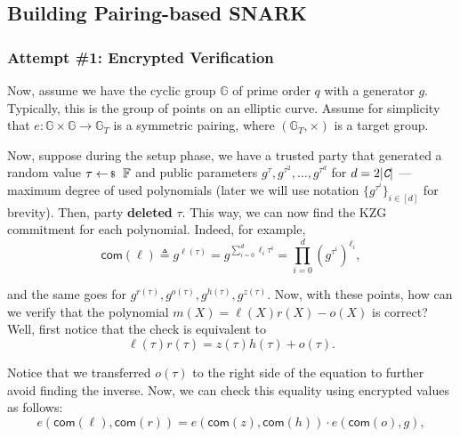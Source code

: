 \documentclass[../lecture-notes-148x210.tex]{subfiles}
\begin{document}
\subsection{Building Pairing-based SNARK}

\subsubsection{Attempt \#1: Encrypted Verification}

Now, assume we have the cyclic group $\mathbb{G}$ of prime order $q$ with a
generator $g$. Typically, this is the group of points on an elliptic curve.
Assume for simplicity that $e: \mathbb{G} \times \mathbb{G} \to \mathbb{G}_T$ is
a symmetric pairing, where $(\mathbb{G}_T, \times)$ is a target group.

Now, suppose during the setup phase, we have a trusted party that generated a random value $\tau \leftarrowS \mathbb{F}$ and public parameters $g^{\tau},g^{\tau^2},\dots,g^{\tau^{d}}$ for $d=2|\textit{\texttt{C}}|$ --- maximum degree of used polynomials (later we will use notation $\{g^{\tau^i}\}_{i \in [d]}$ for brevity). Then, party \textbf{deleted} $\tau$. This way, we can now find the KZG commitment for each polynomial. Indeed, for example,
\begin{equation*}
    \mathsf{com}(\ell) \triangleq g^{\ell(\tau)} = g^{\sum_{i=0}^d \ell_i \tau^i} = \prod_{i=0}^d (g^{\tau^i})^{\ell_i},
\end{equation*}

and the same goes for $g^{r(\tau)}, g^{o(\tau)}, g^{h(\tau)}, g^{z(\tau)}$. Now, with these points, how can we verify that the polynomial $m(X) = \ell(X)r(X) - o(X)$ is correct? Well, first notice that the check is equivalent to
\begin{equation*}
    \ell(\tau)r(\tau) = z(\tau)h(\tau) + o(\tau).
\end{equation*}

Notice that we transferred $o(\tau)$ to the right side of the equation to further avoid finding the inverse. Now, we can check this equality using encrypted values as follows:
\begin{equation*}
    e(\mathsf{com}(\ell), \mathsf{com}(r)) = e(\mathsf{com}(z), \mathsf{com}(h)) \cdot e(\mathsf{com}(o), g),
\end{equation*}
\end{document}
